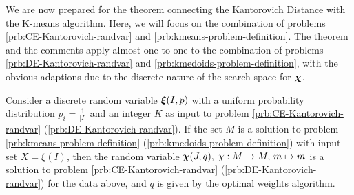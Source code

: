 We are now prepared for the theorem connecting the Kantorovich Distance with the K-means algorithm.
Here, we will focus on the combination of problems \ref{prb:CE-Kantorovich-randvar} and \ref{prb:kmeans-problem-definition}.
The theorem and the comments apply almost one-to-one to the combination of problems \ref{prb:DE-Kantorovich-randvar} and \ref{prb:kmedoids-problem-definition}, with the obvious adaptions due to the discrete nature of the search space for $\boldsymbol\chi$.
\begin{thm}
  \label{thm:kmeans-kantorovich}
  Consider a discrete random variable $\boldsymbol\xi(I,p)$ with a uniform probability distribution $p_i = \frac{1}{|I|}$ and an integer $K$ as input to problem \ref{prb:CE-Kantorovich-randvar} (\ref{prb:DE-Kantorovich-randvar}).
  If the set $M$ is a solution to problem \ref{prb:kmeans-problem-definition} (\ref{prb:kmedoids-problem-definition}) with input set $X=\xi(I)$, then the random variable $\boldsymbol\chi(J,q),\; \chi : M \rightarrow M,\, m\mapsto m$ is a solution to problem \ref{prb:CE-Kantorovich-randvar} (\ref{prb:DE-Kantorovich-randvar}) for the data above, and $q$ is given by the optimal weights algorithm.
\end{thm}
